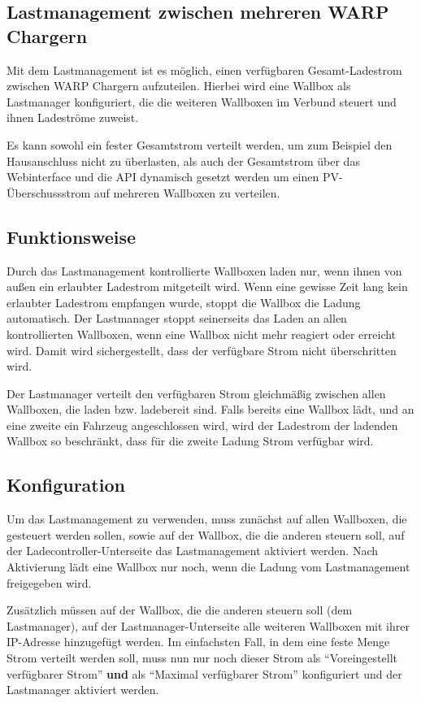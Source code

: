 \documentclass[a4paper,10pt]{article}
\begin{document}
\begin{multicols*}{2}
    \newpage
	\section{Lastmanagement zwischen mehreren WARP Chargern}\label{charge_manager}
	Mit dem Lastmanagement ist es möglich, einen verfügbaren Gesamt-Ladestrom zwischen WARP Chargern aufzuteilen.
	Hierbei wird eine Wallbox als Lastmanager konfiguriert, die die weiteren Wallboxen im Verbund steuert und ihnen Ladeströme
	zuweist.

	Es kann sowohl ein fester Gesamtstrom verteilt werden, um zum Beispiel den Hausanschluss nicht zu überlasten,
	als auch der Gesamtstrom über das Webinterface und die API dynamisch gesetzt werden
	um einen PV-Überschussstrom auf mehreren Wallboxen zu verteilen.

	\subsection{Funktionsweise}
	Durch das Lastmanagement kontrollierte Wallboxen laden nur,
	wenn ihnen von außen ein erlaubter Ladestrom mitgeteilt wird. Wenn eine gewisse Zeit lang
	kein erlaubter Ladestrom empfangen wurde, stoppt die Wallbox die Ladung automatisch.
	Der Lastmanager stoppt seinerseits das Laden an allen kontrollierten Wallboxen,
	wenn eine Wallbox nicht mehr reagiert oder erreicht wird. Damit wird sichergestellt,
	dass der verfügbare Strom nicht überschritten wird.

	Der Lastmanager verteilt den verfügbaren Strom gleichmäßig zwischen allen Wallboxen, die laden bzw. ladebereit sind.
	Falls bereits eine Wallbox lädt, und an eine zweite ein Fahrzeug angeschlossen wird,
	wird der Ladestrom der ladenden Wallbox so beschränkt, dass für die zweite Ladung Strom verfügbar wird.

	\subsection{Konfiguration}
	Um das Lastmanagement zu verwenden, muss zunächst auf allen Wallboxen, die gesteuert werden sollen,
	sowie auf der Wallbox, die die anderen steuern soll, auf der Ladecontroller-Unterseite
	das Lastmanagement aktiviert werden. Nach Aktivierung lädt eine Wallbox nur noch,
	wenn die Ladung vom Lastmanagement freigegeben wird.

	Zusätzlich müssen auf der Wallbox, die die anderen steuern soll (dem Lastmanager), auf der Lastmanager-Unterseite
	alle weiteren Wallboxen mit ihrer IP-Adresse hinzugefügt werden.
	Im einfachsten Fall, in dem eine feste Menge Strom verteilt werden soll, muss nun nur noch dieser
	Strom als \enquote{Voreingestellt verfügbarer Strom} \textbf{und} als \enquote{Maximal verfügbarer Strom}
	konfiguriert und der Lastmanager aktiviert werden.


\end{multicols*}
\end{document}
